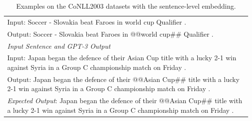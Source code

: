 \documentclass[11pt]{article}
\begin{document}
\begin{table}[th!]
{\begin{tabular}{l}
Input: Soccer - Slovakia beat Faroes in world cup Qualifier . \\
Output: Soccer - Slovakia beat Faroes in @@world cup\#\# Qualifier . \\\midrule
\textit{Input Sentence and GPT-3 Output} \\
Input: Japan began the defence of their Asian Cup title with a lucky 2-1 win against Syria in a Group C championship match on Friday . \\
Output: Japan began the defence of their @@Asian Cup\#\# title with a lucky 2-1 win against Syria in a Group C championship match on Friday . \\
{\color{blue}\it Expected Output}: Japan began the defence of their @@Asian Cup\#\# title with a lucky 2-1 win against Syria in a Group C championship match on Friday . \\\bottomrule

    \end{tabular}
    }
     \caption{Examples on the CoNLL2003 datasets with the sentence-level embedding.}
    \label{tab:example_sentence_level_embedding}
\end{table}
\end{document}

